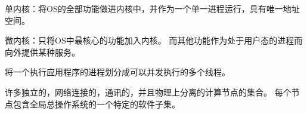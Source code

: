 {    %
    \begin{reviewc}
        单内核：将OS的全部功能做进内核中，并作为一个单一进程运行，具有唯一地址空间。

        微内核：只将OS中最核心的功能加入内核。
        而其他功能作为处于用户态的进程而向外提供某种服务。
    \end{reviewc}

    \begin{reviewc}
        将一个执行应用程序的进程划分成可以并发执行的多个线程。
    \end{reviewc}

    \begin{reviewc}
        许多独立的，网络连接的，通讯的，并且物理上分离的计算节点的集合。
        每个节点包含全局总操作系统的一个特定的软件子集。
    \end{reviewc}
}
